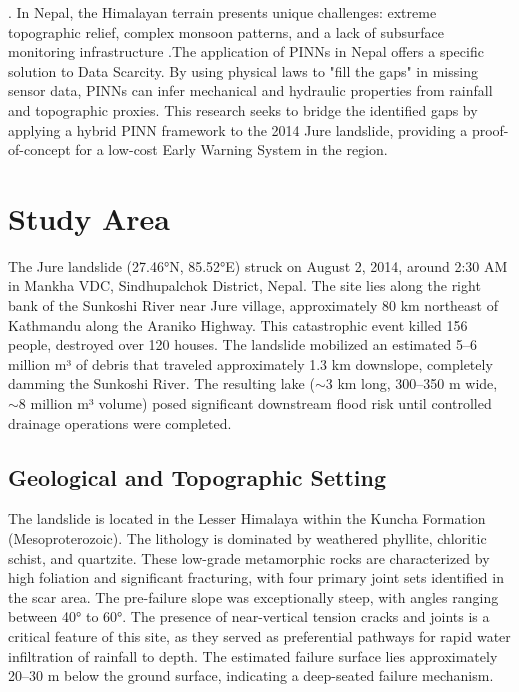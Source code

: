 \documentclass[12pt]{report}
\begin{document}
\citep{wang2025physics}. In Nepal, the Himalayan terrain presents unique challenges: extreme topographic relief, complex monsoon patterns, and a lack of subsurface monitoring infrastructure \citep{adhikari2025ai}.The application of PINNs in Nepal offers a specific solution to Data Scarcity. By using physical laws to "fill the gaps" in missing sensor data, PINNs can infer mechanical and hydraulic properties from rainfall and topographic proxies. This research seeks to bridge the identified gaps by applying a hybrid PINN framework to the 2014 Jure landslide, providing a proof-of-concept for a low-cost Early Warning System in the region.

\setlength{\parindent}{0pt}

\chapter{Study Area}

The Jure landslide (27.46°N, 85.52°E) struck on August 2, 2014, around 2:30 AM in Mankha VDC, Sindhupalchok District, Nepal. The site lies along the right bank of the Sunkoshi River near Jure village, approximately 80 km northeast of Kathmandu along the Araniko Highway. This catastrophic event killed 156 people, destroyed over 120 houses. The landslide mobilized an estimated 5--6 million m³ of debris that traveled approximately 1.3 km downslope, completely damming the Sunkoshi River. The resulting lake ($\sim$3 km long, 300--350 m wide, $\sim$8 million m³ volume) posed significant downstream flood risk until controlled drainage operations were completed.

\section{Geological and Topographic Setting}

The landslide is located in the Lesser Himalaya within the Kuncha Formation (Mesoproterozoic). The lithology is dominated by weathered phyllite, chloritic schist, and quartzite. These low-grade metamorphic rocks are characterized by high foliation and significant fracturing, with four primary joint sets identified in the scar area. The pre-failure slope was exceptionally steep, with angles ranging between 40° to 60°. The presence of near-vertical tension cracks and joints is a critical feature of this site, as they served as preferential pathways for rapid water infiltration of rainfall to depth. The estimated failure surface lies approximately 20--30 m below the ground surface, indicating a deep-seated failure mechanism.
\end{document}
